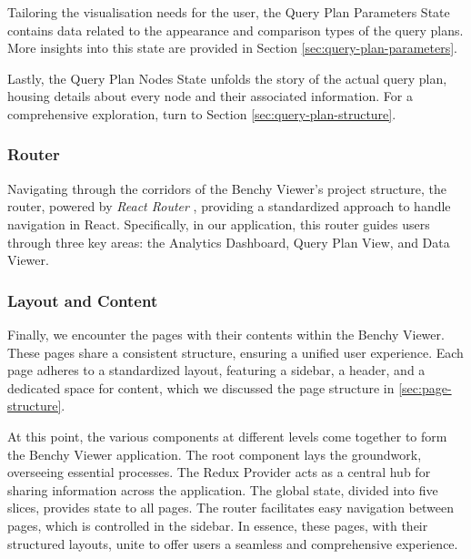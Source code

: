 Tailoring the visualisation needs for the user, the Query Plan Parameters State contains data related to the appearance and comparison types of the query plans. More insights into this state are provided in Section \ref{sec:query-plan-parameters}.

Lastly, the Query Plan Nodes State unfolds the story of the actual query plan, housing details about every node and their associated information. For a comprehensive exploration, turn to Section \ref{sec:query-plan-structure}.


\subsubsection{Router}
Navigating through the corridors of the Benchy Viewer's project structure, the router, powered by \textit{React Router} \parencite{react-router}, providing a standardized approach to handle navigation in React. Specifically, in our application, this router guides users through three key areas: the Analytics Dashboard, Query Plan View, and Data Viewer.

\subsubsection{Layout and Content}
Finally, we encounter the pages with their contents within the Benchy Viewer. These pages share a consistent structure, ensuring a unified user experience. Each page adheres to a standardized layout, featuring a sidebar, a header, and a dedicated space for content, which we discussed the page structure in \ref{sec:page-structure}.

At this point, the various components at different levels come together to form the Benchy Viewer application. The root component lays the groundwork, overseeing essential processes. The Redux Provider acts as a central hub for sharing information across the application. The global state, divided into five slices, provides state to all pages. The router facilitates easy navigation between pages, which is controlled in the sidebar. In essence, these pages, with their structured layouts, unite to offer users a seamless and comprehensive experience.














